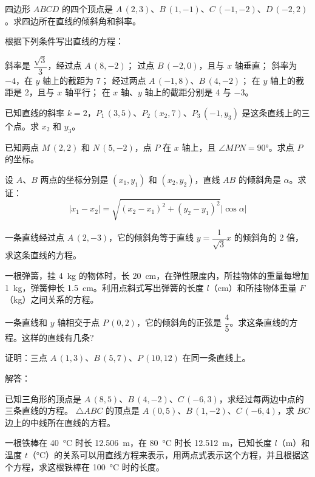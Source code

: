 \begin{Exercise}
  \begin{question}
    \item 四边形 $ABCD$ 的四个顶点是 $A\,(2,3)$、$B\,(1,-1)$、$C\,(-1,-2)$、$D\,(-2,2)$。求四边所在直线的倾斜角和斜率。
    \item 根据下列条件写出直线的方程：
    \begin{tasks}
      \task 斜率是 $\dfrac{\sqrt{3}}{3}$，经过点 $A\,(8,-2)$；
      \task 过点 $B\,(-2,0)$，且与 $x$ 轴垂直；
      \task 斜率为 $-4$，在  $y$ 轴上的截距为 7；
      \task 经过两点 $A\,(-1,8)$、$B\,(4,-2)$；
      \task 在 $y$ 轴上的截距是 2，且与 $x$ 轴平行；
      \task 在 $x$ 轴、$y$ 轴上的截距分别是 4 与 $-3$。
    \end{tasks}
    \item 已知直线的斜率 $k=2$，$P_1\,(3,5)$、$P_2\,(x_2,7)$、$P_3\,(-1,y_3)$ 是这条直线上的三个点。求 $x_2$ 和 $y_3$。
    \item 已知两点 $M\,(2,2)$ 和 $N\,(5,-2)$，点 $P$ 在 $x$ 轴上，且 $\angle MPN =\ang{90}$。求点 $P$ 的坐标。
    \item 设 $A$、$B$ 两点的坐标分别是 $(x_1,y_1)$ 和 $(x_2,y_2)$，直线 $AB$ 的倾斜角是 $\alpha$。求证：
    \[|x_1-x_2|=\sqrt{(x_2-x_1)^2+(y_2-y_1)^2}|\cos\alpha|\]
    \item 一条直线经过点 $A\,(2,-3)$，它的倾斜角等于直线 $y=\dfrac{1}{\sqrt{3}}x$ 的倾斜角的 2 倍，求这条直线的方程。
    \item 一根弹簧，挂 \qty{4}{kg} 的物体时，长 \qty{20}{cm}，在弹性限度内，所挂物体的重量每增加 \qty{1}{kg}，弹簧伸长 \qty{1.5}{cm}。利用点斜式写出弹簧的长度 $l$（\unit{cm}）和所挂物体重量 $F$（\unit{kg}）之间关系的方程。
    \item 一条直线和 $y$ 轴相交于点 $P\,(0,2)$，它的倾斜角的正弦是 $\dfrac{4}{5}$。求这条直线的方程。这样的直线有几条?
    \item 证明：三点 $A\,(1,3)$、$B\,(5,7)$、$P\,(10,12)$ 在同一条直线上。
    \item 解答：
    \begin{tasks}
      \task 已知三角形的顶点是 $A\,(8,5)$、$B\,(4,-2)$、$C\,(-6,3)$，求经过每两边中点的三条直线的方程。
      \task $\triangle ABC$ 的顶点是 $A\,(0,5)$、$B\,(1,-2)$、$C\,(-6,4)$，求 $BC$ 边上的中线所在直线的方程。
    \end{tasks}
    \item 一根铁棒在 \qty{40}{\celsius} 时长 \qty{12.506}{m}，在 \qty{80}{\celsius} 时长 \qty{12.512}{m}，已知长度 $l$（\unit{m}）和温度 $t$（\unit{\celsius}）的关系可以用直线方程来表示，用两点式表示这个方程，并且根据这个方程，求这根铁棒在 \qty{100}{\celsius} 时的长度。

\end{question}
\end{Exercise}
